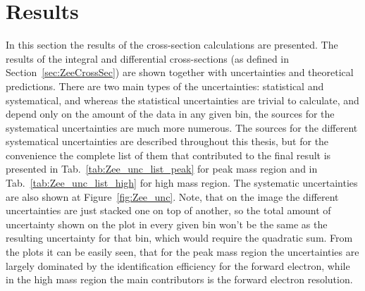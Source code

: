 \chapter{Results}
\label{sec:Results}

In this section the results of the cross-section calculations are presented. The results of the integral and differential cross-sections (as defined in Section~\ref{sec:ZeeCrossSec}) are shown together with uncertainties and theoretical predictions. There are two main types of the uncertainties: statistical and systematical, and whereas the statistical uncertainties are trivial to calculate, and depend only on the amount of the data in any given bin, the sources for the systematical uncertainties are much more numerous. The sources for the different systematical uncertainties are described throughout this thesis, but for the convenience the complete list of them that contributed to the final result is presented in Tab.~\ref{tab:Zee_unc_list_peak} for peak mass region and in Tab.~\ref{tab:Zee_unc_list_high} for high mass region. The systematic uncertainties are also shown at Figure~\ref{fig:Zee_unc}. Note, that on the image the different uncertainties are just stacked one on top of another, so the total amount of uncertainty shown on the plot in every given bin won't be the same as the resulting uncertainty for that bin, which would require the quadratic sum. From the plots it can be easily seen, that for the peak mass region the uncertainties are largely dominated by the identification efficiency for the forward electron, while in the high mass region the main contributors is the forward electron resolution.

